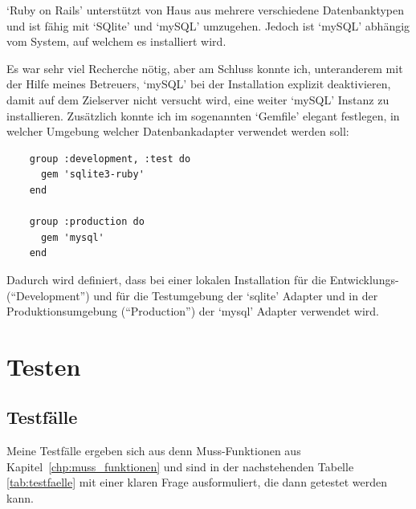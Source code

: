 `Ruby on Rails' unterstützt von Haus aus mehrere verschiedene Datenbanktypen und
ist fähig mit `SQlite' und `mySQL' umzugehen. Jedoch ist `mySQL' abhängig vom
System, auf welchem es installiert wird.

Es war sehr viel Recherche nötig, aber am Schluss konnte ich, unteranderem mit
der Hilfe meines Betreuers, `mySQL' bei der Installation explizit deaktivieren,
damit auf dem Zielserver nicht versucht wird, eine weiter `mySQL' Instanz zu
installieren. Zusätzlich konnte ich im sogenannten `Gemfile' elegant festlegen,
in welcher Umgebung welcher Datenbankadapter verwendet werden soll:

\begin{verbatim}
    group :development, :test do
      gem 'sqlite3-ruby'
    end
    
    group :production do
      gem 'mysql'
    end
\end{verbatim}

Dadurch wird definiert, dass bei einer lokalen Installation für die Entwicklungs-
(``Development'') und für die Testumgebung der `sqlite' Adapter und in der 
Produktionsumgebung (``Production'') der `mysql' Adapter verwendet wird.

\section{Testen}
\subsection{Testfälle}
Meine Testfälle ergeben sich aus denn Muss-Funktionen aus Kapitel~\ref{chp:muss_funktionen}
und sind in der nachstehenden Tabelle \ref{tab:testfaelle} mit einer klaren Frage
ausformuliert, die dann getestet werden kann.

